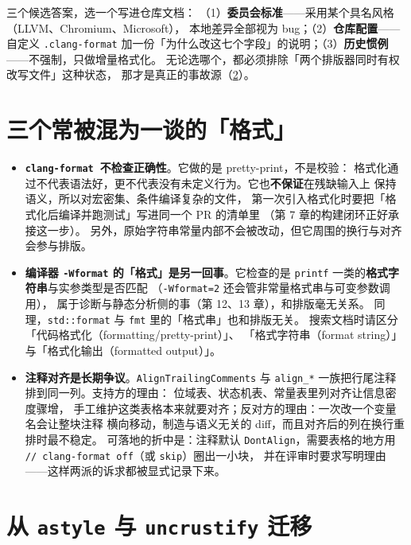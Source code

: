 \documentclass[12pt,a4paper,fontset=fandol]{ctexbook}
\newcommand{\Tp}[1]{\texttt{#1}}
\newcommand{\Lib}[1]{\textbf{\texttt{#1}}}
\newcommand{\Fmt}{\Lib{clang-format}}
\begin{document}
\begin{guideline}[title={选型先定「谁说了算」，再定工具}]
  三个候选答案，选一个写进仓库文档：
  （1）\textbf{委员会标准}——采用某个具名风格（LLVM、Chromium、Microsoft），
  本地差异全部视为 bug；（2）\textbf{仓库配置}——自定义 \texttt{.clang-format}
  加一份「为什么改这七个字段」的说明；（3）\textbf{历史惯例}——不强制，只做增量格式化。
  无论选哪个，都必须排除「两个排版器同时有权改写文件」这种状态，
  那才是真正的事故源（\ref{sec:ch11-s6}）。
\end{guideline}

\section{三个常被混为一谈的「格式」}\label{sec:ch11-s5}

\begin{itemize}
  \item \textbf{\Fmt\ 不检查正确性}。它做的是 pretty-print，不是校验：
    格式化通过不代表语法好，更不代表没有未定义行为。它也\textbf{不保证}在残缺输入上
    保持语义，所以对宏密集、条件编译复杂的文件，
    第一次引入格式化时要把「格式化后编译并跑测试」写进同一个 PR 的清单里
    （第 7 章的构建闭环正好承接这一步）。
    另外，原始字符串常量内部不会被改动，但它周围的换行与对齐会参与排版。
  \item \textbf{编译器 \texttt{-Wformat} 的「格式」是另一回事}。它检查的是
    \texttt{printf} 一类的\textbf{格式字符串}与实参类型是否匹配
    （\texttt{-Wformat=2} 还会管非常量格式串与可变参数调用），
    属于诊断与静态分析侧的事（第 12、13 章），和排版毫无关系。
    同理，\texttt{std::format} 与 \Tp{fmt} 里的「格式串」也和排版无关。
    搜索文档时请区分「代码格式化（formatting/pretty-print）」、
    「格式字符串（format string）」与「格式化输出（formatted output）」。
  \item \textbf{注释对齐是长期争议}。\texttt{AlignTrailingComments}
    与 \texttt{align\_*} 一族把行尾注释排到同一列。支持方的理由：
    位域表、状态机表、常量表里列对齐让信息密度骤增，
    手工维护这类表格本来就要对齐；反对方的理由：一次改一个变量名会让整块注释
    横向移动，制造与语义无关的 diff，而且对齐后的列在换行重排时最不稳定。
    可落地的折中是：注释默认 \texttt{DontAlign}，需要表格的地方用
    \texttt{// clang-format off}（或 \texttt{skip}）圈出一小块，
    并在评审时要求写明理由——这样两派的诉求都被显式记录下来。
\end{itemize}

\section{从 \Lib{astyle} 与 \Lib{uncrustify} 迁移}\label{sec:ch11-s6}
\end{document}
